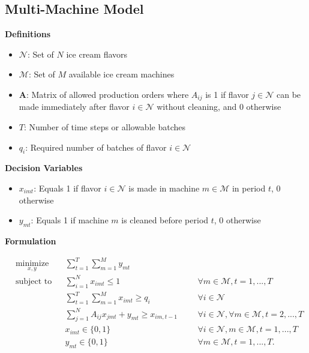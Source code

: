 \documentclass{article}
\begin{document}
\subsection*{Multi-Machine Model}

\noindent\textbf{Definitions}
\begin{itemize}
    \item $\mathcal{N}$: Set of $N$ ice cream flavors
    \item $\mathcal{M}$: Set of $M$ available ice cream machines
    \item $\mathbf{A}$: Matrix of allowed production orders where $A_{ij}$ is 1 if flavor $j \in \mathcal{N}$ can be made immediately after flavor $i \in \mathcal{N}$ without cleaning, and 0 otherwise
    \item $T$: Number of time steps or allowable batches
    \item $q_i$: Required number of batches of flavor $i \in \mathcal{N}$
 

\end{itemize} 

\noindent\textbf{Decision Variables}
\begin{itemize}
    \item $x_{imt}$: Equals 1 if flavor $i \in \mathcal{N}$ is made in machine $m \in \mathcal{M}$ in period $t$, 0 otherwise
    \item $y_{mt}$: Equals 1 if machine $m$ is cleaned before period $t$, 0 otherwise
\end{itemize}

\noindent\textbf{Formulation}

\begin{equation*}
\begin{aligned}
& \underset{x,y}{\text{minimize}}
    &&  \sum_{t=1}^T \sum_{m=1}^M y_{mt} \\
& \text{subject to}
    && \sum_{i=1}^N x_{imt} \leq 1
        &&&\forall m \in \mathcal{M}, t=1,...,T \\
&
    & & \sum_{t=1}^{T}\sum_{m=1}^{M}{x_{imt}} \geq q_i
        &&&\forall i \in \mathcal{N} \\
&
     && \sum_{j=1}^N A_{ij}x_{jmt} + y_{mt} \geq x_{im,t-1}
            &&&\forall i \in \mathcal{N}, \forall m \in \mathcal{M}, t=2,...,T \\
&
    & & x_{imt} \in \{0,1\}
        &&&\forall i \in \mathcal{N}, m \in \mathcal{M}, t=1,...,T  \\
&
    & & y_{mt} \in \{0,1\}
        &&&\forall m \in \mathcal{M}, t = 1,...,T.
\end{aligned}
\end{equation*}
\end{document}
